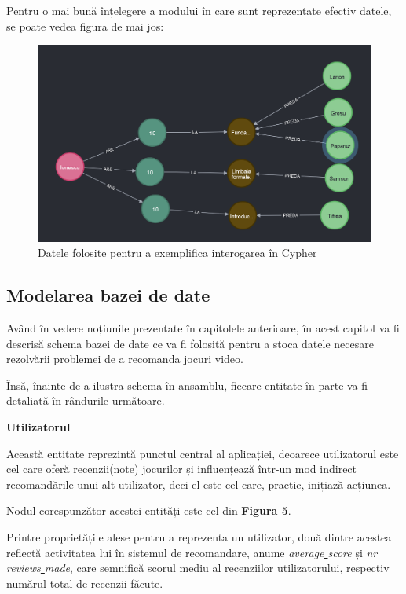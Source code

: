 \documentclass[12pt,a4paper]{report}
\begin{document}
Pentru o mai bună înțelegere a modului în care sunt reprezentate efectiv datele, se poate vedea figura de mai jos:

\begin{figure}[H]
\centering
\caption{}
\begin{adjustbox}{max size={\textwidth}{\textheight}}
\includegraphics[scale=0.5]{exemplu_4_neo4j}
\end{adjustbox}
\caption*{Datele folosite pentru a exemplifica interogarea în Cypher}
\end{figure}

\subsection{Modelarea bazei de date}


Având în vedere noțiunile prezentate în capitolele anterioare, în acest capitol va fi descrisă schema bazei de date ce va fi folosită pentru a stoca datele necesare rezolvării problemei de a recomanda jocuri video.

Însă, înainte de a ilustra schema în ansamblu, fiecare entitate în parte va fi detaliată în rândurile următoare.

\bigskip
\textbf{Utilizatorul}
\bigskip

Această entitate reprezintă punctul central al aplicației, deoarece utilizatorul este cel care oferă recenzii(note) jocurilor și influențează într-un mod indirect recomandările unui alt utilizator, deci el este cel care, practic, inițiază acțiunea.

Nodul corespunzător acestei entități este cel din \textbf{Figura 5}.

Printre proprietățile alese pentru a reprezenta un utilizator, două dintre acestea reflectă activitatea lui în sistemul de recomandare, anume \emph{average\underline{ }score} și \emph{nr\underline{ }reviews\underline{ }made}, care semnifică scorul mediu al recenziilor utilizatorului, respectiv numărul total de recenzii făcute.
\end{document}
